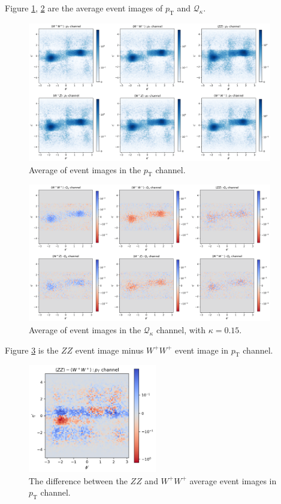\documentclass[12pt]{article}
\begin{document}
		Figure \ref{fig:event_image_PT_deltaeta1}, \ref{fig:event_image_Qk_deltaeta1} are the average event images of $p_\text{T}$ and $\mathcal{Q}_\kappa$.
		\begin{figure}[htpb]
			\centering
			\includegraphics[width=0.95\textwidth]{event_image_PT-deltaeta1.png}
			\caption{Average of event images in the $p_\text{T}$ channel.}
			\label{fig:event_image_PT_deltaeta1}
		\end{figure}
		\begin{figure}[htpb]
			\centering
			\includegraphics[width=0.95\textwidth]{event_image_Qk-deltaeta1.png}
			\caption{Average of event images in the $\mathcal{Q}_\kappa$ channel, with $\kappa = 0.15$.}
			\label{fig:event_image_Qk_deltaeta1}
		\end{figure}

		Figure \ref{fig:event_image_PT_ZZ-W+W+_deltaeta1} is the $ZZ$ event image minus $W^{+}W^{+}$ event image in $p_\text{T}$ channel.
		\begin{figure}[htpb]
			\centering
			\includegraphics[width=0.5\textwidth]{event_image_PT_ZZ-W+W+-deltaeta.png}
			\caption{The difference between the $ZZ$ and $W^{+}W^{+}$ average event images in $p_\text{T}$ channel.}
			\label{fig:event_image_PT_ZZ-W+W+_deltaeta1}
		\end{figure}
\end{document}
